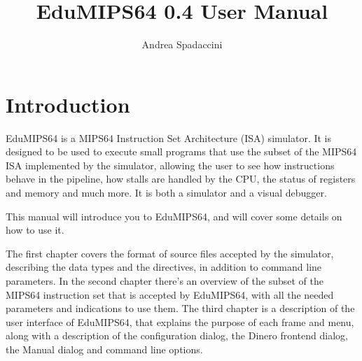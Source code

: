 \documentclass[12pt]{report}
\author{Andrea Spadaccini}
\title{EduMIPS64 0.4 User Manual}
\newcommand{\EM}{EduMIPS64}
\newcommand{\MS}{MIPS64}
\begin{document}
\setlength{\baselineskip}{1.60\baselineskip} %

\newlength{\centeroffset}
\setlength{\centeroffset}{-0.5\oddsidemargin}
\addtolength{\centeroffset}{0.5\evensidemargin}
\thispagestyle{empty}
\noindent\hspace*{\centeroffset}

\noindent\hspace*{\centeroffset}



\pagebreak

\tableofcontents
\listoftables
\lstlistoflistings
\chapter*{Introduction}
\EM{} is a \MS{} Instruction Set Architecture (ISA) simulator. It is designed to
be used to execute small programs that use the subset of the \MS{} ISA
implemented by the simulator, allowing the user to see how instructions behave
in the pipeline, how stalls are handled by the CPU, the status of registers and
memory and much more. It is both a simulator and a visual debugger.

This manual will introduce you to \EM{}, and will cover some details on how to
use it.

The first chapter covers the format of source files accepted by the simulator,
describing the data types and the directives, in addition to command line
parameters. In the second chapter there's an overview of the subset of the \MS{}
instruction set that is accepted by \EM{}, with all the needed parameters and
indications to use them. The third chapter is a description of the user
interface of \EM{}, that explains the purpose of each frame and menu, along with a
description of the configuration dialog, the Dinero frontend dialog, the Manual
dialog and command line options. 
\end{document}
